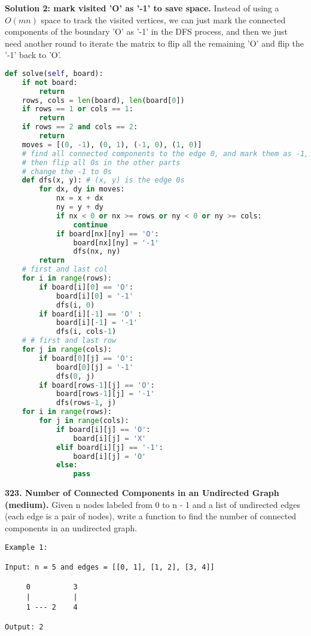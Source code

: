 \documentclass[../main.tex]{subfiles}
\begin{document}
\begin{examples}[resume]
\begin{lstlisting}[language=Python]
\end{lstlisting}
\textbf{Solution 2: mark visited 'O' as '-1' to save space.} Instead of using a $O(mn)$ space to track the visited vertices, we can just mark the connected components of the boundary 'O' as '-1' in the DFS process, and then we just need another round to iterate the matrix to flip all the remaining 'O' and flip the '-1' back to 'O'. 
\begin{lstlisting}[language=Python]
def solve(self, board):
    if not board:
        return
    rows, cols = len(board), len(board[0])
    if rows == 1 or cols == 1:
        return
    if rows == 2 and cols == 2:
        return 
    moves = [(0, -1), (0, 1), (-1, 0), (1, 0)]
    # find all connected components to the edge 0, and mark them as -1, 
    # then flip all 0s in the other parts
    # change the -1 to 0s
    def dfs(x, y): # (x, y) is the edge 0s
        for dx, dy in moves:
            nx = x + dx
            ny = y + dy
            if nx < 0 or nx >= rows or ny < 0 or ny >= cols:
                continue
            if board[nx][ny] == 'O':
                board[nx][ny] = '-1'
                dfs(nx, ny)
        return
    # first and last col
    for i in range(rows):
        if board[i][0] == 'O':
            board[i][0] = '-1'
            dfs(i, 0)
        if board[i][-1] == 'O' :
            board[i][-1] = '-1'
            dfs(i, cols-1)
    # # first and last row
    for j in range(cols):
        if board[0][j] == 'O':
            board[0][j] = '-1'
            dfs(0, j)
        if board[rows-1][j] == 'O':
            board[rows-1][j] = '-1'
            dfs(rows-1, j)
    for i in range(rows):
        for j in range(cols):
            if board[i][j] == 'O':
                board[i][j] = 'X'
            elif board[i][j] == '-1':
                board[i][j] = 'O'
            else:
                pass
\end{lstlisting}

\item \textbf{323. Number of Connected Components in an Undirected Graph (medium).} 
Given n nodes labeled from 0 to n - 1 and a list of undirected edges (each edge is a pair of nodes), write a function to find the number of connected components in an undirected graph.
\begin{lstlisting}[numbers=none]
Example 1:

Input: n = 5 and edges = [[0, 1], [1, 2], [3, 4]]

     0          3
     |          |
     1 --- 2    4 

Output: 2


\end{lstlisting}
\end{examples}
\end{document}
